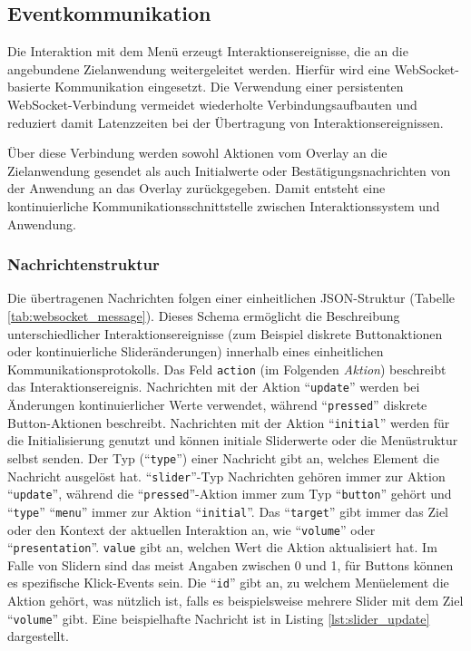 \subsection{Eventkommunikation}
\label{sec:eventcommunication}
Die Interaktion mit dem Menü erzeugt Interaktionsereignisse, die an die angebundene Zielanwendung weitergeleitet werden. 
Hierfür wird eine WebSocket-basierte Kommunikation eingesetzt. Die Verwendung einer persistenten WebSocket-Verbindung vermeidet wiederholte Verbindungsaufbauten und reduziert damit Latenzzeiten bei der Übertragung von Interaktionsereignissen.

Über diese Verbindung werden sowohl Aktionen vom Overlay an die Zielanwendung gesendet als auch Initialwerte oder Bestätigungsnachrichten von der Anwendung an das Overlay zurückgegeben.
Damit entsteht eine kontinuierliche Kommunikationsschnittstelle zwischen Interaktionssystem und Anwendung.

\subsubsection{Nachrichtenstruktur}
Die übertragenen Nachrichten folgen einer einheitlichen JSON-Struktur (Tabelle \ref{tab:websocket_message}).
Dieses Schema ermöglicht die Beschreibung unterschiedlicher Interaktionsereignisse (zum Beispiel diskrete Buttonaktionen
oder kontinuierliche Slideränderungen) innerhalb eines einheitlichen Kommunikationsprotokolls.
Das Feld \texttt{action} (im Folgenden \textit{Aktion}) beschreibt das Interaktionsereignis.
Nachrichten mit der Aktion ``\texttt{update}'' werden bei Änderungen kontinuierlicher Werte verwendet, während ``\texttt{pressed}'' diskrete Button-Aktionen beschreibt. Nachrichten mit der Aktion ``\texttt{initial}'' werden für die Initialisierung genutzt und können initiale Sliderwerte oder die Menüstruktur selbst senden. Der Typ (``\texttt{type}'') einer Nachricht gibt an, welches Element die Nachricht ausgelöst hat. ``\texttt{slider}''-Typ Nachrichten gehören immer zur Aktion ``\texttt{update}'', während die ``\texttt{pressed}''-Aktion immer zum Typ ``\texttt{button}'' gehört und ``\texttt{type}'' ``\texttt{menu}'' immer zur Aktion ``\texttt{initial}''. Das ``\texttt{target}'' gibt immer das Ziel oder den Kontext der aktuellen Interaktion an, wie ``\texttt{volume}'' oder ``\texttt{presentation}''. \texttt{value} gibt an, welchen Wert die Aktion aktualisiert hat. Im Falle von Slidern sind das meist Angaben zwischen 0 und 1, für Buttons können es spezifische Klick-Events sein. Die ``\texttt{id}'' gibt an, zu welchem Menüelement die Aktion gehört, was nützlich ist, falls es beispielsweise mehrere Slider mit dem Ziel ``\texttt{volume}'' gibt.
Eine beispielhafte Nachricht ist in Listing \ref{lst:slider_update} dargestellt.

